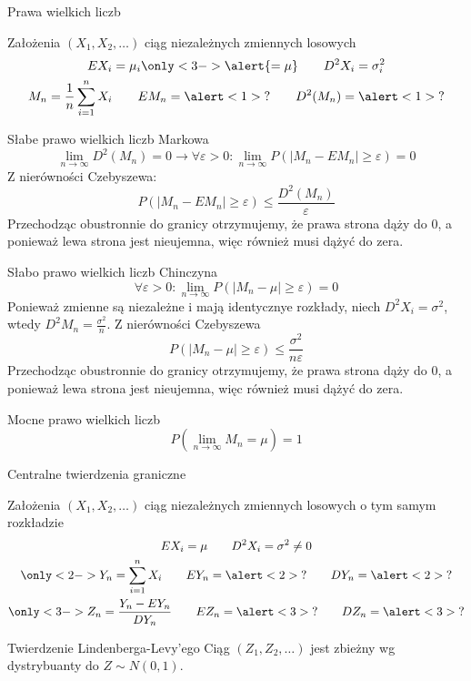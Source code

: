 \documentclass{mp}
\begin{document}
\begin{frame}{Prawa wielkich liczb}
\begin{block}{Założenia}
$(X_1,X_2,\ldots)$ ciąg \alert<1>{niezależnych} zmiennych losowych \\
\begin{gather*}
EX_i=\mu_i\only<3->{\alert{=\mu}} \qquad D^2X_i=\sigma_i^2 \\
M_n=\frac{1}{n}\sum_{i=1}^n X_i \qquad EM_n=\alert<1>{?} \qquad D^2(M_n)=\alert<1>{?}
\end{gather*}
\note{\[EM_n=\frac{1}{n}\sum_{i=1}^n \mu_i \qquad D^2(M_n)=\frac{1}{n^2}\sum_{i=1}^n\sigma_i^2\]}
\end{block}
{
\begin{block}{Słabe prawo wielkich liczb Markowa}
\[ \lim_{n\to\infty} D^2(M_n)=0 \to \forall \varepsilon>0\colon \lim_{n\to\infty} P(\left|M_n-EM_n\right|\geq\varepsilon)=0 \]
\note
{
	Z nierówności Czebyszewa:
	\[P(\left|M_n-EM_n\right|\geq\varepsilon)\leq \frac{D^2(M_n)}{\varepsilon}\]
	Przechodząc obustronnie do granicy otrzymujemy, że prawa strona dąży do 0, a ponieważ lewa strona jest nieujemna, więc również musi dążyć do zera.
}
\end{block}
}
{
\begin{block}{Słabo prawo wielkich liczb Chinczyna}
\[ \forall \varepsilon>0\colon \lim_{n\to\infty} P(\left|M_n-\mu\right|\geq\varepsilon)=0 \]
\note
{
	Ponieważ zmienne są niezależne i mają identycznye rozkłady, niech $D^2X_i=\sigma^2$, wtedy $D^2M_n=\frac{\sigma^2}{n}$. Z nierówności Czebyszewa
	\[P(\left|M_n-\mu\right|\geq\varepsilon)\leq \frac{\sigma^2}{n\varepsilon} \]
	Przechodząc obustronnie do granicy otrzymujemy, że prawa strona dąży do 0, a ponieważ lewa strona jest nieujemna, więc również musi dążyć do zera.
}
\end{block}
}
{
\begin{block}{Mocne prawo wielkich liczb}
\[P(\lim_{n\to\infty} M_n=\mu)=1\]
\end{block}
}
\end{frame}
\begin{frame}{Centralne twierdzenia graniczne}
\begin{block}{Założenia}
$(X_1,X_2,\ldots)$ ciąg niezależnych zmiennych losowych o tym samym rozkładzie
\begin{gather*}
EX_i=\mu \qquad D^2X_i=\sigma^2\neq0 \\
\only<2->{Y_n=\sum_{i=1}^n X_i \qquad EY_n=\alert<2>{?} \qquad DY_n=\alert<2>{?}}\\
\only<3->{Z_n=\frac{Y_n-EY_n}{DY_n} \qquad EZ_n=\alert<3>{?} \qquad DZ_n=\alert<3>{?}}
\end{gather*}
\end{block}
{
\begin{block}{Twierdzenie Lindenberga-Levy'ego}
Ciąg $(Z_1,Z_2,\ldots)$ jest zbieżny wg dystrybuanty do $Z\sim N(0,1)$.
\end{block}
}
\end{frame}
\end{document}
